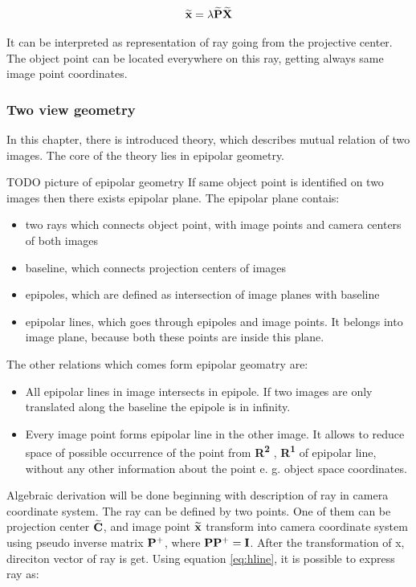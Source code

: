 \documentclass[a4paper,12pt]{article}
\newcommand{\ematr}[1]{
{\bf #1}
}
\newcommand{\ehvect}[1]{
{\bf \widetilde{#1}}
}
\newcommand{\eucl}[1]{
{\bf R\textsuperscript{#1}}
}
\begin{document}
\begin{equation}
\ehvect{x}=\lambda\ehvect{P}\ehvect{X}
 \end{equation}

It can be interpreted as representation of ray going from the projective center. 
The object point can be located everywhere on this ray, getting always 
same image point coordinates.

\subsubsection{Two view geometry}

In this chapter, there is introduced theory, which describes mutual relation of two images. 
The core of the theory lies in epipolar geometry.

TODO picture of epipolar geometry
If same object point is identified on two images then there exists epipolar plane.
The epipolar plane contais:

\begin{itemize}
\item two rays which connects object point, with image points and camera centers of both images
\item baseline, which connects projection centers of images
\item epipoles, which are defined as intersection of image planes with baseline
\item epipolar lines, which goes through epipoles and image points. It belongs into image plane, 
      because both these points are inside this plane.  
\end{itemize}


The other relations which comes form epipolar geomatry are:

\begin{itemize}
\item All epipolar lines in image intersects in epipole. If two images are only translated along the baseline 
     the epipole is in infinity.
\item Every image point forms epipolar line in the other image. It allows to reduce space of possible occurrence of the point 
      from \eucl{2}, \eucl{1} of epipolar line, without any other information about the point e. g. object space coordinates. 
\end{itemize}

Algebraic derivation will be done beginning with description of ray in camera coordinate system.
The ray can be defined by two points.
One of them can be projection center $\ehvect{C}$, and 
image point $\ehvect{x}$ transform into camera coordinate system using pseudo inverse matrix $\ematr{P}^{+}$, 
where $\ematr{P}\ematr{P}^{+} = \ematr{I}$. After the transformation of x, direciton vector of ray is get.
Using equation \eqref{eq:hline}, it is possible to express ray as:
\end{document}
